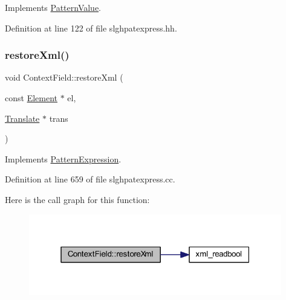 Implements \mbox{\hyperlink{class_pattern_value_a0dbf85240fe6310e36596fea3bb02f2e}{Pattern\+Value}}.



Definition at line 122 of file slghpatexpress.\+hh.

\mbox{\label{class_context_field_a6d877297cc00c922dea6a1cfe12bec09}} 
\subsubsection{\texorpdfstring{restoreXml()}{restoreXml()}}
{\footnotesize\ttfamily void Context\+Field\+::restore\+Xml (\begin{DoxyParamCaption}\item[{const \mbox{\hyperlink{class_element}{Element}} $\ast$}]{el,  }\item[{\mbox{\hyperlink{class_translate}{Translate}} $\ast$}]{trans }\end{DoxyParamCaption})\hspace{0.3cm}{\ttfamily [virtual]}}



Implements \mbox{\hyperlink{class_pattern_expression_ad8986afdddbe7a8b64fdcf10478b5715}{Pattern\+Expression}}.



Definition at line 659 of file slghpatexpress.\+cc.

Here is the call graph for this function\+:
\nopagebreak
\begin{figure}[H]
\begin{center}
\leavevmode
\includegraphics[width=313pt]{class_context_field_a6d877297cc00c922dea6a1cfe12bec09_cgraph}
\end{center}
\end{figure}
\mbox{\label{class_context_field_aa54ed050666315f386a216d1d2d98806}} 
